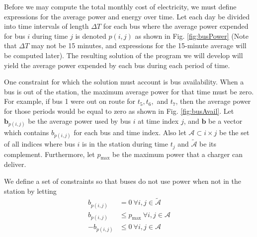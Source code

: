 Before we may compute the total monthly cost of electricity, we must define expressions for the average power and energy over time.  Let each day be divided into time intervals of length $\Delta T$ for each bus where the average power expended for bus $i$ during time $j$ is denoted $p(i,j)$ as shown in Fig. \ref{fig:busPower} (Note that $\Delta T$ may not be 15 minutes, and expressions for the 15-minute average will be computed later). The resulting solution of the program we will develop will yield the average power expended by each bus during each period of time.
\par One constraint for which the solution must account is bus availability.  When a bus is out of the station, the maximum average power for that time must be zero. For example, if bus 1 were out on route for $t_5, t_6,$ and $t_7$, then the average power for those periods would be equal to zero as shown in Fig. \ref{fig:busAvail}. Let $\bm{b}_{p(i,j)}$ be the average power used by bus $i$ at time index $j$, and $\bm{b}$ be a vector which contains $b_{p(i,j)}$ for each bus and time index. Also let $\mathcal{A} \subset {i\times j}$  be the set of all indices where bus $i$ is in the station during time $t_j$ and $\tilde{\mathcal{A}}$ be its complement. Furthermore, let $p_{\text{max}}$ be the maximum power that a charger can deliver. 
\par We define a set of constraints so that buses do not use power when not in the station by letting
\begin{equation}\label{eqn:obj:power2}\begin{aligned}
	b_{p(i,j)} &= 0 \ \forall i,j \in \tilde{\mathcal{A}}  \\
	b_{p(i,j)} &\le p_{\text{max}} \ \forall i,j \in \mathcal{A} \\
	-b_{p(i,j)} &\le 0              \ \forall i,j \in \mathcal{A} 
\end{aligned}\end{equation}

